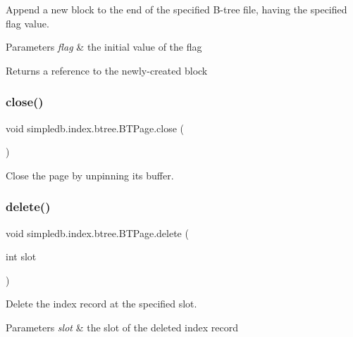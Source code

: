 Append a new block to the end of the specified B-\/tree file, having the specified flag value. 
\begin{DoxyParams}{Parameters}
{\em flag} & the initial value of the flag \\
\hline
\end{DoxyParams}
\begin{DoxyReturn}{Returns}
a reference to the newly-\/created block 
\end{DoxyReturn}
\mbox{\label{classsimpledb_1_1index_1_1btree_1_1BTPage_add568d42fe2e359adbacdfe4adee61b3}} 
\subsubsection{\texorpdfstring{close()}{close()}}
{\footnotesize\ttfamily void simpledb.\+index.\+btree.\+B\+T\+Page.\+close (\begin{DoxyParamCaption}{ }\end{DoxyParamCaption})\hspace{0.3cm}{\ttfamily [inline]}}

Close the page by unpinning its buffer. \mbox{\label{classsimpledb_1_1index_1_1btree_1_1BTPage_a202eb8527fc7ff66b5b1e328c00df15d}} 
\subsubsection{\texorpdfstring{delete()}{delete()}}
{\footnotesize\ttfamily void simpledb.\+index.\+btree.\+B\+T\+Page.\+delete (\begin{DoxyParamCaption}\item[{int}]{slot }\end{DoxyParamCaption})\hspace{0.3cm}{\ttfamily [inline]}}

Delete the index record at the specified slot. 
\begin{DoxyParams}{Parameters}
{\em slot} & the slot of the deleted index record \\
\hline
\end{DoxyParams}
\mbox{\label{classsimpledb_1_1index_1_1btree_1_1BTPage_ab1ad1f77a657d6bca43d428a55e33efd}} 

